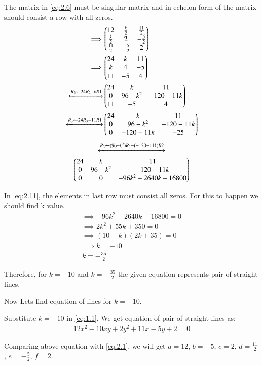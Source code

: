 \documentclass[journal,12pt,twocolumn]{IEEEtran}
\begin{document}
The matrix in \eqref{eq:2.6} must be singular matrix and in echelon form of the matrix should consist a row with all zeros.
\begin{align}
    \implies&\begin{pmatrix}12 & \frac{k}{2} & \frac{11}{2} \\ \frac{k}{2} & 2 & -\frac{5}{2} \\ \frac{11}{2} & -\frac{5}{2} & 2\end{pmatrix}\\
    \implies&\begin{pmatrix}24 & k & 11 \\ k & 4 & -5 \\ 11 & -5 & 4\end{pmatrix}\\
    \xleftrightarrow[]{R_2\leftarrow 24R_2-kR1}&\begin{pmatrix}24 & k & 11 \\ 0 & 96-k^2 & -120-11k \\ 11 & -5 & 4\end{pmatrix}\\
    \xleftrightarrow[]{R_3\leftarrow 24R_3-11R1}&\begin{pmatrix}24 & k & 11 \\ 0 & 96-k^2 & -120-11k \\ 0 & -120-11k & -25\end{pmatrix}
\end{align}
\begin{multline}
    \xleftrightarrow[]{R_3\leftarrow (96-k^2)R_3-(-120-11k)R2}\\\begin{pmatrix}24 & k & 11 \\ 0 & 96-k^2 & -120-11k \\ 0 & 0 & -96k^2-2640k-16800\end{pmatrix}\label{eq:2.11}
\end{multline}

In \eqref{eq:2.11}, the elements in last row must consist all zeros. For this to happen we should find k value.
\begin{align}
    \implies-96k^2-2640k-16800=0\\
    \implies2k^2+55k+350=0\\
    \implies(10+k)(2k+35)=0\\
    \implies k=-10\nonumber\\k=-\frac{35}{2}
\end{align}

Therefore, for $k=-10$ and $k=-\frac{35}{2}$ the given equation represents pair of straight lines.

Now Lets find equation of lines for $k=-10$.

Substitute $k=-10$ in \eqref{eq:1.1}. We get equation of pair of straight lines as:
\begin{align}
    12x^2-10xy+2y^2+11x-5y+2=0
\end{align}

Comparing above equation with \eqref{eq:2.1}, we will get $a=12$, $b=-5$, $c=2$, $d=\frac{11}{2}$, $e=-\frac{5}{2}$, $f=2$.
\end{document}
